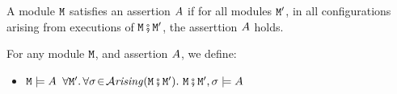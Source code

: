 A module $\M$ satisfies an assertion $\A$ if for all modules $\M'$, in all configurations arising from executions of $\M\mkpair\M'$, the asserttion $\A$ holds.

\begin{definition}
\label{def:module_satisfies}
For any module $\M$, and  assertion $\A$, we define:
\begin{itemize}
\item
$\M \models \A$ \IFF  $\forall \M'.\, \forall \sigma\!\in\!\Arising{\M\mkpair\M'}.\   \M\mkpair\M', \sigma \models \A$
\end{itemize}
\end{definition}

